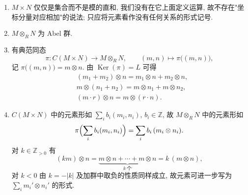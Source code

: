 \begin{remark}\label{rem:tensor-basic}
\mbox{}\par\vspace{-0.2em}
\begin{enumerate}
\item $M\times N$ 仅仅是集合而不是模的直和, 我们没有在它上面定义运算, 故不存在"坐标分量对应相加"的说法; 只应将元素看作没有任何关系的形式记号.

\item $M\otimes_R N$ 为 Abel 群.

\item 有典范同态
\[
  \pi\colon C(M\times N)\longrightarrow M\otimes_R N,\qquad (m,n)\longmapsto \pi\bigl((m,n)\bigr),
\]
记 $\pi\bigl((m,n)\bigr)=m\otimes n$. 由 $\operatorname{Ker}(\pi)=L$ 可得
\[
  \begin{aligned}
    &(m_1+m_2)\otimes n=m_1\otimes n+m_2\otimes n,\\
    &m\otimes(n_1+n_2)=m\otimes n_1+m\otimes n_2,\\
    &(m\cdot r)\otimes n=m\otimes(r\cdot n).
  \end{aligned}
\]
\item $C(M\times N)$ 中的元素形如 $\sum_i b_i(m_i,n_i)$, $b_i\in\mathbb{Z}$, 故 $M\otimes_R N$ 中的元素形如
\[
  \pi\Bigl(\sum_i b_i(m_i,n_i)\Bigr)=\sum_i b_i\,(m_i\otimes n_i).
\]
对 $k\in\mathbb{Z}_{>0}$ 有
\[
  (km)\otimes n=\underbrace{m\otimes n+\cdots+m\otimes n}_{k\ \text{个}}=k\,(m\otimes n),
\]
对 $k<0$ 由 $k=-|k|$ 及加群中取负的性质同样成立,
故元素可进一步写为 $\sum_i m_i'\otimes n_i'$ 的形式.
\end{enumerate}
\end{remark}

